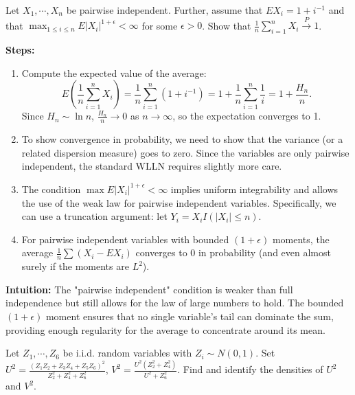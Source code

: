 \begin{exercise}
\label{applied:2010:2}
Let $X_{1}, \cdots, X_{n}$ be pairwise independent. Further, assume that $E X_{i} = 1 + i^{-1}$ and that $\max_{1 \leq i \leq n} E | X_{i} |^{1 + \epsilon} < \infty$ for some $\epsilon > 0$. Show that $\frac{1}{n} \sum_{i=1}^{n} X_{i} \xrightarrow{P} 1$.
\end{exercise}

\begin{solution}
\textbf{Steps:}
\begin{enumerate}
    \item Compute the expected value of the average:
    \[ E\left(\frac{1}{n} \sum_{i=1}^n X_i\right) = \frac{1}{n} \sum_{i=1}^n (1 + i^{-1}) = 1 + \frac{1}{n} \sum_{i=1}^n \frac{1}{i} = 1 + \frac{H_n}{n}. \]
    Since $H_n \sim \ln n$, $\frac{H_n}{n} \to 0$ as $n \to \infty$, so the expectation converges to 1.
    \item To show convergence in probability, we need to show that the variance (or a related dispersion measure) goes to zero. Since the variables are only pairwise independent, the standard WLLN requires slightly more care.
    \item The condition $\max E |X_i|^{1+\epsilon} < \infty$ implies uniform integrability and allows the use of the weak law for pairwise independent variables. Specifically, we can use a truncation argument: let $Y_i = X_i I(|X_i| \le n)$.
    \item For pairwise independent variables with bounded $(1+\epsilon)$ moments, the average $\frac{1}{n} \sum (X_i - E X_i)$ converges to 0 in probability (and even almost surely if the moments are $L^2$).
\end{enumerate}

\textbf{Intuition:}
The "pairwise independent" condition is weaker than full independence but still allows for the law of large numbers to hold. The bounded $(1+\epsilon)$ moment ensures that no single variable's tail can dominate the sum, providing enough regularity for the average to concentrate around its mean.
\end{solution}

\begin{exercise}
\label{applied:2010:3}
Let $Z_{1}, \cdots, Z_{6}$ be i.i.d. random variables with $Z_{i} \sim N(0, 1)$. Set $U^{2} = \frac{(Z_{1} Z_{2} + Z_{3} Z_{4} + Z_{5} Z_{6})^{2}}{Z_{2}^{2} + Z_{4}^{2} + Z_{6}^{2}}$, $V^{2} = \frac{U^{2} (Z_{2}^{2} + Z_{4}^{2})}{U^{2} + Z_{6}^{2}}$. Find and identify the densities of $U^{2}$ and $V^{2}$.
\end{exercise}

